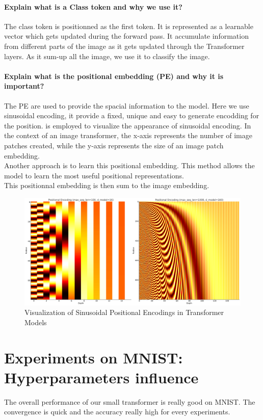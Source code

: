 \paragraph{Explain what is a Class token and why we use it?}
The class token is positionned as the first token. It is represented as a learnable vector which gets updated during the forward pass. It accumulate information from different parts of the image as it gets updated through the Transformer layers. As it sum-up all the image, we use it to classify the image.

\paragraph{Explain what is the positional embedding (PE) and why it is important?}
The PE are used to provide the spacial information to the model. Here we use sinusoidal encoding, it provide a fixed, unique and easy to generate encodding for the position.  is employed to visualize the appearance of sinusoidal encoding. In the context of an image transformer, the x-axis represents the number of image patches created, while the y-axis represents the size of an image patch embedding.  \\
Another approach is to learn this positional embedding. This method allows the model to learn the most useful positional representations. \\
This positionnal embedding is then sum to the image embedding.

\begin{figure}[H]
    \centering
    \includegraphics*[width=.75\textwidth]{figs/Transformers/positional_encoding_subplot.pdf}
    \caption{Visualization of Sinusoidal Positional Encodings in Transformer Models}
    \label{fig:pe_viz}
\end{figure}

\section{Experiments on MNIST: Hyperparameters influence}
The overall performance of our small transformer is really good on MNIST. The convergence is quick and the accuracy really high for every experiments.

